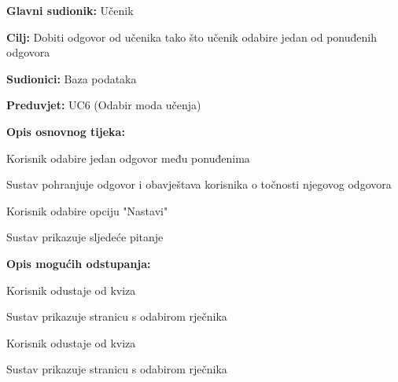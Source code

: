 					\noindent {}
					\begin{packed_item}
						
						\item \textbf{Glavni sudionik: }Učenik
						\item  \textbf{Cilj:} Dobiti odgovor od učenika tako što učenik odabire jedan od ponuđenih odgovora 
						\item  \textbf{Sudionici:} Baza podataka
						\item  \textbf{Preduvjet:} UC6 (Odabir moda učenja)
						\item  \textbf{Opis osnovnog tijeka:}
						
						\item[] \begin{packed_enum}
							
							\item Korisnik odabire jedan odgovor među ponuđenima
							\item Sustav pohranjuje odgovor i obavještava korisnika o točnosti njegovog odgovora
							\item Korisnik odabire opciju "Nastavi"
							\item Sustav prikazuje sljedeće pitanje
						\end{packed_enum}
						
						\item  \textbf{Opis mogućih odstupanja:}
						
						\item[] \begin{packed_item}
							
							\item[3.a] Korisnik odustaje od kviza
							\item[] \begin{packed_enum}
								
								\item Sustav prikazuje stranicu s odabirom rječnika
								
							\end{packed_enum}
							
							\item[4.a] Korisnik odustaje od kviza 
							\item[] \begin{packed_enum}
								
								\item Sustav prikazuje stranicu s odabirom rječnika
								
							\end{packed_enum}
							
						\end{packed_item}
					\end{packed_item}
					
